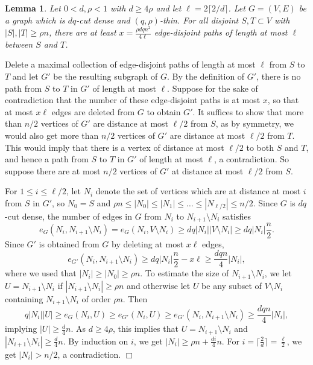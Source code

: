 \documentclass[11pt]{article}
\newtheorem{lemma}[theorem]{Lemma}
\newenvironment{proof}
      {\medskip\noindent{\bf Proof:}\hspace{1mm}}
      {\hfill$\Box$\medskip}
\begin{document}
\begin{lemma}\label{shortpath}
Let $0<d,\rho<1$ with $d \geq 4\rho$ and let $\ell=2 \lceil 2/d \rceil$. Let $G=(V,E)$ be a graph which is $dq$-cut dense and $(q,\rho)$-thin. For all disjoint $S,T \subset V$ with $|S|,|T| \geq \rho n$, there are at least $x=\frac{\rho dqn^2}{4\ell}$ edge-disjoint paths of length at most $\ell$  between $S$ and $T$.
\end{lemma}
\begin{proof}
Delete a maximal collection of edge-disjoint paths of length at most $\ell$ from $S$ to $T$ and let $G'$ be the resulting subgraph of $G$. By the definition of $G'$, there is no path from $S$ to $T$ in $G'$ of length at most $\ell$.
Suppose for the sake of contradiction that the number of these edge-disjoint paths is at most $x$, so that at most $x\ell$ edges are deleted from $G$ to obtain $G'$. It suffices to show that more than $n/2$ vertices of $G'$ are distance at most $\ell/2$ from $S$, as by symmetry, we would also get more than $n/2$ vertices of $G'$ are distance at most $\ell/2$ from $T$.
This would imply that there is a vertex of distance at most $\ell/2$ to both $S$ and $T$, and hence a path from $S$ to $T$ in $G'$ of length at most $\ell$, a contradiction. So suppose there are at most
$n/2$ vertices of $G'$ at distance at most $\ell/2$ from $S$.

For $1 \leq i \leq \ell/2$, let $N_i$ denote the set of vertices which are at distance at most $i$ from $S$ in $G'$, so $N_0=S$ and $\rho n \leq |N_0| \leq |N_1| \leq \dots \leq |N_{\ell/2}| \leq n/2$.
Since $G$ is $dq$-cut dense, the number of edges in $G$ from $N_i$ to $N_{i+1} \setminus N_i$ satisfies
$$e_G(N_i,N_{i+1} \setminus N_i)=e_G(N_i,V \setminus N_i) \geq dq|N_i||V \setminus N_i| \geq dq|N_i|\frac{n}{2}.$$
Since $G'$ is obtained from $G$ by deleting at most $x\ell$ edges, $$e_{G'}(N_i,N_{i+1} \setminus N_i) \geq dq|N_i|\frac{n}{2}-x\ell \geq \frac{dqn}{4}|N_i|,$$
where we used that $|N_{i}| \geq |N_0| \geq \rho n$. To estimate the size of $N_{i+1} \setminus N_i$, we let $U=N_{i+1} \setminus N_i$ if $|N_{i+1} \setminus N_i| \geq \rho n$ and otherwise let $U$ be any subset of $V \setminus N_i$ containing $N_{i+1} \setminus N_i$ of order $\rho n$. Then $$q|N_i||U|\geq e_G(N_i,U) \geq e_{G'}(N_i,U) \geq e_{G'}(N_i,N_{i+1}\setminus N_i) \geq \frac{dqn}{4}|N_i|,$$  implying $|U| \geq \frac{d}{4}n$. As $d \geq 4\rho$, this implies that $U = N_{i+1} \setminus N_i$ and $|N_{i+1}\setminus N_i| \geq \frac{d}{4}n$.  By induction on $i$, we get
$|N_i| \geq \rho n +\frac{di}{4}n$.
For $i= \lceil \frac{2}{d} \rceil=\frac{\ell}{2}$, we get $|N_i| > n/2$, a contradiction.
\end{proof}
\end{document}
